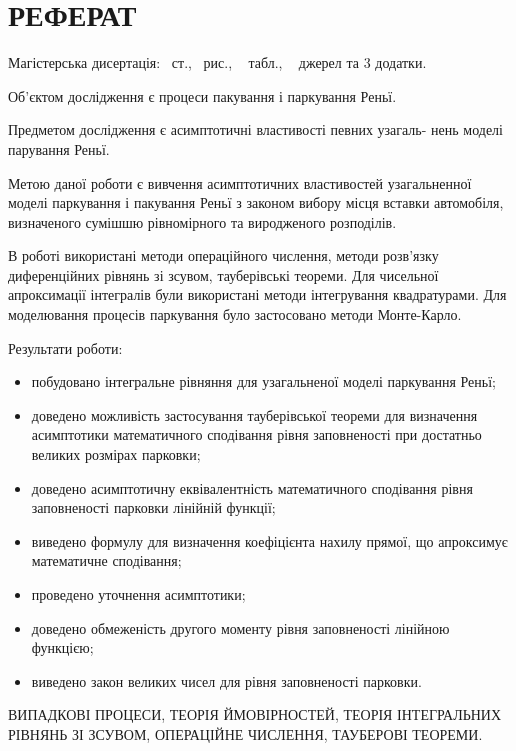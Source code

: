 \chapter*{РЕФЕРАТ}

Магістерська дисертація: \pageref*{MyLastPage}~ст., \totfig~рис., \tottab~ табл., ~ джерел та 3 додатки.

Об'єктом дослідження є процеси пакування і паркування Реньї.

Предметом дослідження є асимптотичні властивості певних узагаль- нень моделі парування Реньї.

Метою даної роботи є вивчення асимптотичних властивостей узагальненної моделі паркування і пакування Реньї з законом вибору місця вставки автомобіля, визначеного сумішшю рівномірного та виродженого розподілів.

В роботі використані методи операційного числення, методи розв'язку диференційних рівнянь зі зсувом, тауберівські теореми. Для чисельної апроксимації інтегралів були використані методи інтегрування квадратурами. Для моделювання процесів паркування було застосовано методи Монте-Карло.

Результати роботи:
\begin{itemize}
	\item побудовано інтегральне рівняння для узагальненої моделі паркування Реньї;
	\item доведено можливість застосування тауберівської теореми для визначення асимптотики математичного сподівання рівня заповненості при достатньо великих розмірах парковки;
	\item доведено асимптотичну еквівалентність математичного сподівання рівня заповненості парковки лінійній функції;
	\item виведено формулу для визначення коефіцієнта нахилу прямої, що апроксимує математичне сподівання;
	\item проведено уточнення асимптотики;
	\item доведено обмеженість другого моменту рівня заповненості лінійною функцією;
	\item виведено закон великих чисел для рівня заповненості парковки.
\end{itemize}

\MakeUppercase{випадкові процеси, теорія ймовірностей, теорія інтегральних рівнянь зі зсувом, операційне числення, тауберові теореми.} 